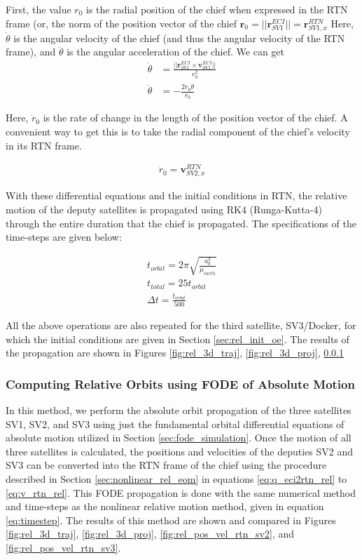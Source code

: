 First, the value $r_0$ is the radial position of the chief when expressed in the RTN frame (or, the norm of the position vector of the chief $\boldsymbol{r}_0 = ||\boldsymbol{r}^{ECI}_{SV1}|| = \boldsymbol{r}^{RTN}_{SV1, x}$ 
Here, $\dot{\theta}$ is the angular velocity of the chief (and thus the angular velocity of the RTN frame), and $\ddot{\theta}$ is the angular acceleration of the chief. We can get 
\begin{align}
    \dot{\theta} &= \frac{{||\boldsymbol{r}_{SV1}^{ECI} \times \boldsymbol{v}_{SV1}^{ECI}||}}{r_0^2} \\
    \ddot{\theta} &= -\frac{2\dot{r}_0\dot{\theta}}{r_0}
\end{align}

Here, $\dot{r}_0$ is the rate of change in the length of the position vector of the chief. A convenient way to get this is to take the radial component of the chief's velocity in its RTN frame.

\begin{align*}
    \dot{r}_0 = \boldsymbol{v}^{RTN}_{SV2, x}
\end{align*}

With these differential equations and the initial conditions in RTN, the relative motion of the deputy satellites is propagated using RK4 (Runga-Kutta-4) through the entire duration that the chief is propagated. The specifications of the time-steps are given below:

\begin{align}
    t_{orbit} = 2\pi \sqrt{\frac{a_0^3}{\mu_{earth}}} \\
    t_{total} = 25t_{orbit} \\
    \Delta t = \frac{t_{orbit}}{500} \label{eq:timestep}%
\end{align}


All the above operations are also repeated for the third satellite, SV3/Docker, for which the initial conditions are given in Section \ref{sec:rel_init_oe}.
The results of the propagation are shown in Figures \ref{fig:rel_3d_traj}, \ref{fig:rel_3d_proj}, \ref{}

\subsubsection{Computing Relative Orbits using FODE of Absolute Motion}

In this method, we perform the absolute orbit propagation of the three satellites SV1, SV2, and SV3 using just the fundamental orbital differential equations of absolute motion utilized in Section \ref{sec:fode_simulation}. Once the motion of all three satellites is calculated, the positions and velocities of the deputies SV2 and SV3 can be converted into the RTN frame of the chief using the procedure described in Section \ref{sec:nonlinear_rel_eom} in equations \ref{eq:q_eci2rtn_rel} to \ref{eq:v_rtn_rel}. This FODE propagation is done with the same numerical method and time-steps as the nonlinear relative motion method, given in equation \ref{eq:timestep}. The results of this method are shown and compared in Figures \ref{fig:rel_3d_traj}, \ref{fig:rel_3d_proj}, \ref{fig:rel_pos_vel_rtn_sv2}, and \ref{fig:rel_pos_vel_rtn_sv3}.


